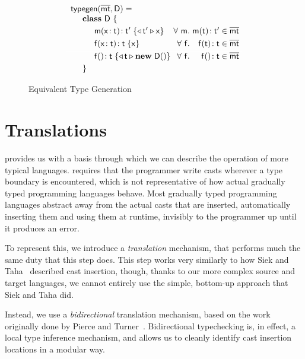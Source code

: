\documentclass[a4paper,USenglish]{tex/lipics-v2016}
\begin{document}
\begin{figure}
\hrulefill
\footnotesize
\vspace{4mm}
\[\begin{array}{l@{~}r@{}r@{~}r@{~}r@{~}rr}
\arrayrulecolor{white}
\typegen{\bmt}{\D} = \\
\SP \class~\D~\{
\\[1mm]
\SPP \Mdef\m\x\t\tp {{\MonCast\tp{\x}}} 
&
\All m \Mtype\m\t\tp\in\bmt
\\[1mm]\hline
\SPP \Mdef\f\x\t\t {\x}
&
\All f \Mtype\f\t\t\in\bmt
\\[1mm]\hline
\SPP \Mdefz\f\t{{\MonCast\t{\New\D{}}}}
&
 \All f \Mtype\f{}\t \in \bmt
\\[1mm]
\SP\}
\end{array}
\]
\hrulefill
\caption{Equivalent Type Generation} \label{typegen}
\end{figure}

\clearpage

\section{Translations}

\kafka provides us with a basis through which we can describe the operation
of more typical languages. \kafka requires that the programmer write casts
wherever a type boundary is encountered, which is not representative of how
actual gradually typed programming languages behave. Most gradually typed
programming languages abstract away from the actual casts that are inserted,
automatically inserting them and using them at runtime, invisibly to the
programmer up until it produces an error.

To represent this, we introduce a \emph{translation} mechanism, that performs much the same duty that this step does. This step works very similarly to how Siek and Taha~\cite{SiekTaha06} described cast insertion, though, thanks to our more complex source and target languages, we cannot entirely use the simple, bottom-up approach that Siek and Taha did.

Instead, we use a \emph{bidirectional} translation mechanism, based on the work originally done by Pierce and Turner~\cite{lti-pierce}. Bidirectional typechecking is, in effect, a local type inference mechanism, and allows us to cleanly identify cast insertion locations in a modular way.

\begin{mathpar}



\end{mathpar}
\end{document}
